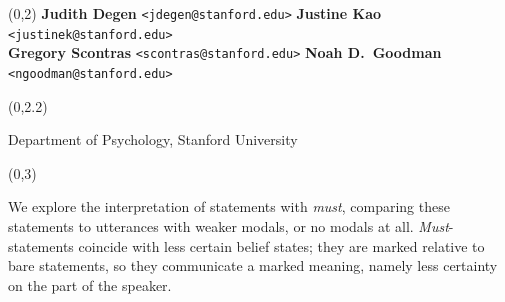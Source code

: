 \documentclass[a0,portrait]{a0poster}
\newcommand{\superlightgray}[1]{\textcolor{superlightgray}{#1}}
\newcommand{\xxlightgray}[1]{\textcolor{xxlightgray}{#1}}
\def\LHead#1{\noindent{\LARGE\color{myBlue} #1}}
\begin{document}
\begin{textblock}{15}(0,2)
\LARGE{ \textbf{Judith Degen}  \texttt{<jdegen@stanford.edu>}  \hfill  \textbf{Justine Kao} \texttt{<justinek@stanford.edu>}\\
\textbf{Gregory Scontras} \texttt{<scontras@stanford.edu>}
\textbf{Noah D.~Goodman} \texttt{<ngoodman@stanford.edu>}}
\end{textblock}

\begin{textblock}{15}(0,2.2)
\begin{center}
\Large{Department of Psychology, Stanford University}
\end{center}
\end{textblock}




\begin{textblock}{7}(0,3)
  \LHead{Abstract}

\Large
We explore the interpretation of statements with \emph{must}, comparing these statements to utterances with weaker modals, or no modals at all. \emph{Must}-statements coincide with less certain belief states; they are marked relative to bare statements, so they communicate a marked meaning, namely less certainty on the part of the speaker.
\end{textblock}



\end{document}
